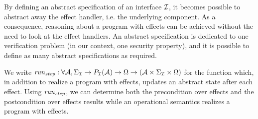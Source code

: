 By defining an abstract specification of an interface $\mathcal{I}$, it becomes possible
to abstract away the effect handler, i.e. the underlying component.
%
As a consequence, reasoning about a program with effects can be achieved without
the need to look at the effect handlers.
%
An abstract specification is dedicated to one verification problem (in our
context, one security property), and it is possible to define as many abstract
specifications as required.

We write
$\mathit{run}_{\mathit{step}} : \forall \mathcal{A}, \Sigma_{\mathcal{I}} \rightarrow
P_{\mathcal{I}}(\mathcal{A}) \rightarrow \Omega \rightarrow (\mathcal{A} \times
\Sigma_{\mathcal{I}} \times \Omega)$ for the function which, in addition to realize a
program with effects, updates an abstract state after each effect.
%
Using $\mathit{run}_{\mathit{step}}$, we can determine both the precondition over
effects and the postcondition over effects results while an operational
semantics realizes a program with effects.

